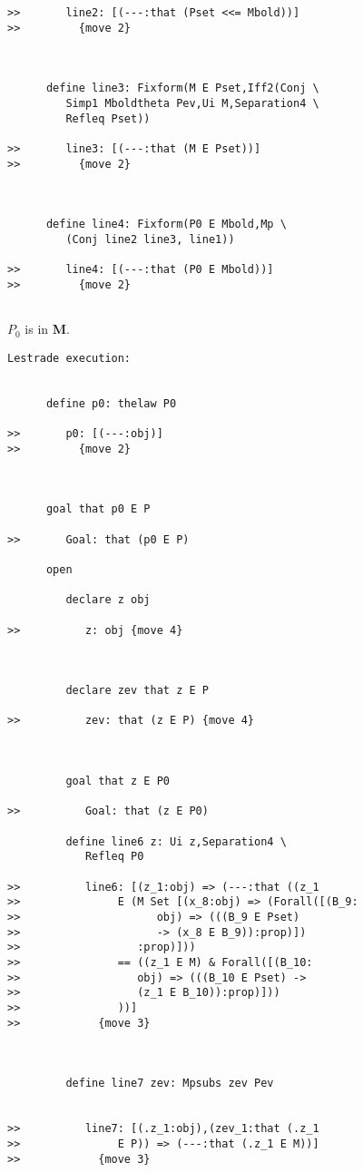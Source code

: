 \documentclass[12pt]{article}
\begin{document}
\begin{verbatim}
>>       line2: [(---:that (Pset <<= Mbold))]
>>         {move 2}



      define line3: Fixform(M E Pset,Iff2(Conj \
         Simp1 Mboldtheta Pev,Ui M,Separation4 \
         Refleq Pset))

>>       line3: [(---:that (M E Pset))]
>>         {move 2}



      define line4: Fixform(P0 E Mbold,Mp \
         (Conj line2 line3, line1))

>>       line4: [(---:that (P0 E Mbold))]
>>         {move 2}


\end{verbatim}

$P_0$ is in {\bf M}.

\begin{verbatim}Lestrade execution:


      define p0: thelaw P0

>>       p0: [(---:obj)]
>>         {move 2}



      goal that p0 E P

>>       Goal: that (p0 E P)

      open

         declare z obj

>>          z: obj {move 4}



         declare zev that z E P

>>          zev: that (z E P) {move 4}



         goal that z E P0

>>          Goal: that (z E P0)

         define line6 z: Ui z,Separation4 \
            Refleq P0

>>          line6: [(z_1:obj) => (---:that ((z_1
>>               E (M Set [(x_8:obj) => (Forall([(B_9:
>>                     obj) => (((B_9 E Pset)
>>                     -> (x_8 E B_9)):prop)])
>>                  :prop)]))
>>               == ((z_1 E M) & Forall([(B_10:
>>                  obj) => (((B_10 E Pset) ->
>>                  (z_1 E B_10)):prop)]))
>>               ))]
>>            {move 3}



         define line7 zev: Mpsubs zev Pev


>>          line7: [(.z_1:obj),(zev_1:that (.z_1
>>               E P)) => (---:that (.z_1 E M))]
>>            {move 3}




\end{verbatim}
\end{document}
